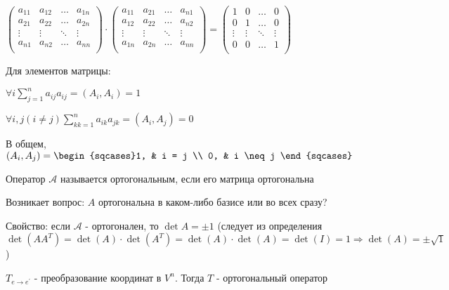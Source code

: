 \documentclass[12pt]{article}
\begin{document}
    $\begin{pmatrix}
         a_{11} & a_{12} & \dots & a_{1n} \\
         a_{21} & a_{22} & \dots & a_{2n} \\
         \vdots & \vdots & \ddots & \vdots \\
         a_{n1} & a_{n2} & \dots & a_{nn} \\
    \end{pmatrix} \cdot \begin{pmatrix}
         a_{11} & a_{21} & \dots & a_{n1} \\
         a_{12} & a_{22} & \dots & a_{n2} \\
         \vdots & \vdots & \ddots & \vdots \\
         a_{1n} & a_{2n} & \dots & a_{nn} \\
    \end{pmatrix} = \begin{pmatrix}
         1 & 0 & \dots & 0 \\
         0 & 1 & \dots & 0 \\
         \vdots & \vdots & \ddots & \vdots \\
         0 & 0 & \dots & 1 \\
    \end{pmatrix}$

    Для элементов матрицы:

    $\forall i \sum^n_{j=1} a_{ij} a_{ij} = (A_i, A_i) = 1$

    $\forall i, j (i \neq j) \sum^n_{kk=1} a_{ik} a_{jk} = (A_i, A_j) = 0$

    В общем, $(A_i, A_j) = \begin{sqcases}1, & i = j \\ 0, & i \neq j \end{sqcases}$

    \Def Оператор $\mathcal{A}$ называется ортогональным, если его матрица ортогональна

    Возникает вопрос: $A$ ортогональна в каком-либо базисе или во всех сразу?

    Свойство: если $\mathcal{A}$ - ортогонален, то $\det A = \pm 1$ (следует из определения $\det(AA^T) = \det(A) \cdot \det(A^T) = \det(A) \cdot \det(A) = \det(I) = 1 \Longrightarrow \det(A) = \pm \sqrt{1}$)

    \begin{MyTheorem}
        \Ths $T_{e\to e^\prime}$ - преобразование координат в $V^n$. Тогда $T$ - ортогональный оператор
    \end{MyTheorem}
\end{document}
